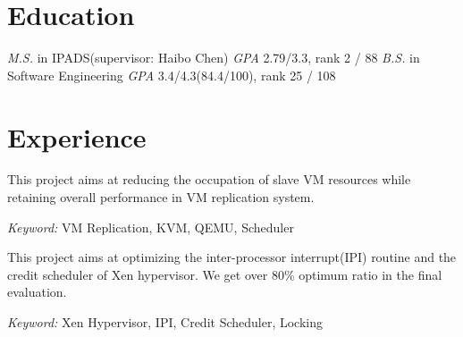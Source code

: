 \documentclass{resume}
\begin{document}


 
\section{Education}
\textit{M.S.} in IPADS(supervisor: Haibo Chen)
\textit{GPA} 2.79/3.3, rank 2 / 88
\textit{B.S.} in Software Engineering
\textit{GPA} 3.4/4.3(84.4/100), rank 25 / 108



\section{Experience}


This project aims at reducing the occupation of slave VM resources while retaining overall performance in VM replication system.

\textit{Keyword: } VM Replication, KVM,  QEMU, Scheduler



This project aims at optimizing the inter-processor interrupt(IPI) routine and the credit scheduler of Xen hypervisor. We get over 80\% optimum ratio in the final evaluation.

\textit{Keyword: } Xen Hypervisor, IPI, Credit Scheduler, Locking

\end{document}
